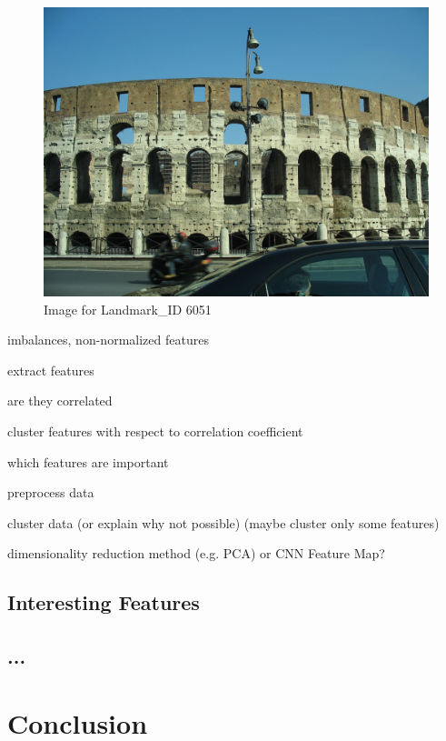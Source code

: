 \begin{figure}[t]
	\includegraphics[width=\textwidth]{images/6051}
	\caption{Image for Landmark\_ID 6051}
	\label{6051}
\end{figure}

imbalances, non-normalized features

extract features

are they correlated

cluster features with respect to correlation coefficient

which features are important

preprocess data

cluster data (or explain why not possible) (maybe cluster only some features)

dimensionality reduction method (e.g. PCA) or CNN Feature Map?

\section*{Interesting Features}
\section*{...}

\chapter{Conclusion}